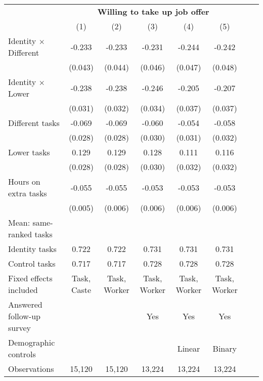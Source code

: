          \def\sym#1{\ifmmode^{#1}\else\(^{#1}\)\fi}         \begin{tabular}{l*{7}{c}}         \toprule          & \multicolumn{5}{c}{\textbf{Willing to take up job offer}} \bigstrut \\         \cline{2-6} \addlinespace
                    &\multicolumn{1}{c}{(1)}&\multicolumn{1}{c}{(2)}&\multicolumn{1}{c}{(3)}&\multicolumn{1}{c}{(4)}&\multicolumn{1}{c}{(5)}\\
\midrule
Identity $\times$ Different&      -0.233&      -0.233&      -0.231&      -0.244&      -0.242\\
                    &     (0.043)&     (0.044)&     (0.046)&     (0.047)&     (0.048)\\
\addlinespace
Identity $\times$ Lower&      -0.238&      -0.238&      -0.246&      -0.205&      -0.207\\
                    &     (0.031)&     (0.032)&     (0.034)&     (0.037)&     (0.037)\\
\addlinespace
Different tasks     &      -0.069&      -0.069&      -0.060&      -0.054&      -0.058\\
                    &     (0.028)&     (0.028)&     (0.030)&     (0.031)&     (0.032)\\
\addlinespace
Lower tasks         &       0.129&       0.129&       0.128&       0.111&       0.116\\
                    &     (0.028)&     (0.028)&     (0.030)&     (0.032)&     (0.032)\\
\addlinespace
Hours on extra tasks&      -0.055&      -0.055&      -0.053&      -0.053&      -0.053\\
                    &     (0.005)&     (0.006)&     (0.006)&     (0.006)&     (0.006)\\
\midrule
Mean: same-ranked tasks&            &            &            &            &            \\
\hspace{0.4cm} Identity tasks&       0.722&       0.722&       0.731&       0.731&       0.731\\
\hspace{0.4cm} Control tasks&       0.717&       0.717&       0.728&       0.728&       0.728\\
Fixed effects included& Task, Caste&Task, Worker&Task, Worker&Task, Worker&Task, Worker\\
Answered follow-up survey&            &            &         Yes&         Yes&         Yes\\
Demographic controls&            &            &            &      Linear&      Binary\\
Observations        &      15,120&      15,120&      13,224&      13,224&      13,224\\
\bottomrule
\end{tabular}
